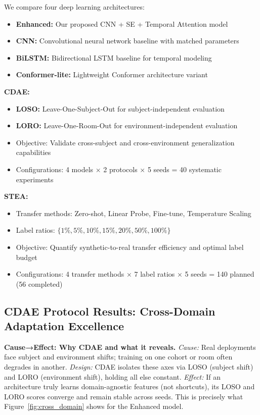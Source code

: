 \documentclass[journal]{IEEEtran}
\begin{document}

We compare four deep learning architectures:
\begin{itemize}
\item \textbf{Enhanced:} Our proposed CNN + SE + Temporal Attention model
\item \textbf{CNN:} Convolutional neural network baseline with matched parameters
\item \textbf{BiLSTM:} Bidirectional LSTM baseline for temporal modeling
\item \textbf{Conformer-lite:} Lightweight Conformer architecture variant
\end{itemize}


\textbf{CDAE:}
\begin{itemize}
\item \textbf{LOSO:} Leave-One-Subject-Out for subject-independent evaluation
\item \textbf{LORO:} Leave-One-Room-Out for environment-independent evaluation
\item Objective: Validate cross-subject and cross-environment generalization capabilities
\item Configurations: 4 models × 2 protocols × 5 seeds = 40 systematic experiments
\end{itemize}

\textbf{STEA:}
\begin{itemize}
\item Transfer methods: Zero-shot, Linear Probe, Fine-tune, Temperature Scaling
\item Label ratios: $\{1\%, 5\%, 10\%, 15\%, 20\%, 50\%, 100\%\}$
\item Objective: Quantify synthetic-to-real transfer efficiency and optimal label budget
\item Configurations: 4 transfer methods × 7 label ratios × 5 seeds = 140 planned (56 completed)
\end{itemize}

\subsection{CDAE Protocol Results: Cross-Domain Adaptation Excellence}

\textbf{Cause→Effect: Why CDAE and what it reveals.} \emph{Cause:} Real deployments face subject and environment shifts; training on one cohort or room often degrades in another. \emph{Design:} CDAE isolates these axes via LOSO (subject shift) and LORO (environment shift), holding all else constant. \emph{Effect:} If an architecture truly learns domain-agnostic features (not shortcuts), its LOSO and LORO scores converge and remain stable across seeds. This is precisely what Figure~\ref{fig:cross_domain} shows for the Enhanced model.
\end{document}

